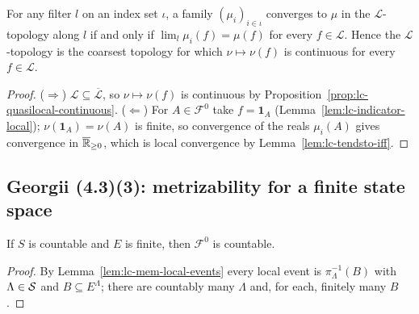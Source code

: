 \begin{theorem}[Georgii (4.3)(2)]
    \label{thm:lc-tendsto-iff-localFunctions}
    \leanok

    For any filter $l$ on an index set $\iota$, a family $(\mu_i)_{i \in \iota}$ converges to
    $\mu$ in the $\mathcal{L}$-topology along $l$ if and only if $\lim_l \mu_i(f) = \mu(f)$ for
    every $f \in \mathcal{L}$. Hence the $\mathcal{L}$-topology is the coarsest topology for which
    $\nu \mapsto \nu(f)$ is continuous for every $f \in \mathcal{L}$.
\end{theorem}
\begin{proof}
    \leanok

    ($\Rightarrow$) $\mathcal{L} \subseteq \overline{\mathcal{L}}$, so $\nu \mapsto \nu(f)$ is
    continuous by Proposition~\ref{prop:lc-quasilocal-continuous}.
    ($\Leftarrow$) For $A \in \mathcal{F}^0$ take $f = \mathbf{1}_A$
    (Lemma~\ref{lem:lc-indicator-local}); $\nu(\mathbf{1}_A) = \nu(A)$ is finite, so convergence
    of the reals $\mu_i(A)$ gives convergence in $\overline{\mathbb{R}}_{\ge 0}$, which is local
    convergence by Lemma~\ref{lem:lc-tendsto-iff}.
\end{proof}

\subsection*{Georgii (4.3)(3): metrizability for a finite state space}

\begin{lemma}
    \label{lem:lc-countable-local-events}
    \leanok

    If $S$ is countable and $E$ is finite, then $\mathcal{F}^0$ is countable.
\end{lemma}
\begin{proof}
    \leanok

    By Lemma~\ref{lem:lc-mem-local-events} every local event is $\pi_\Lambda^{-1}(B)$ with
    $\Lambda \in \mathcal{S}$ and $B \subseteq E^\Lambda$; there are countably many $\Lambda$ and, for
    each, finitely many $B$.
\end{proof}

